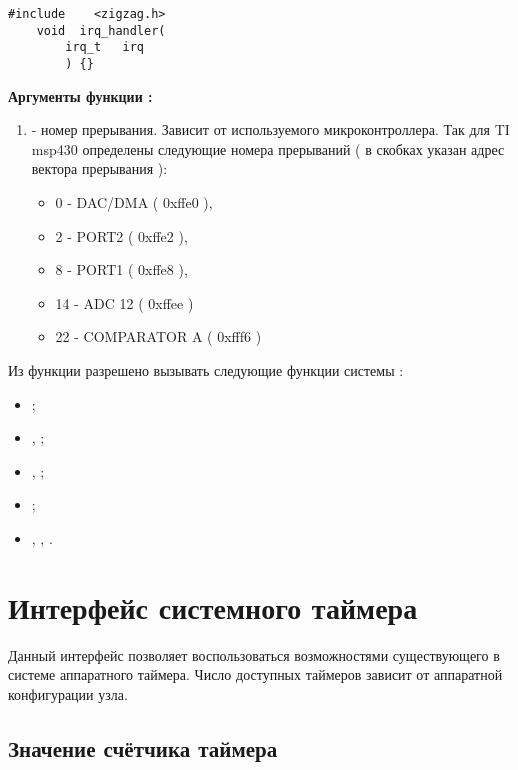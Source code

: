 \begin{lstlisting}[caption=Функция \myfunc{irq\_handler()} - обработчик прерываний., label=irqhandlerfunc ]
    #include    <zigzag.h>
    void  irq_handler(
        irq_t   irq
        ) {}
\end{lstlisting}

{\bfseries Аргументы функции :}

{\itshape
\begin{enumerate}
\item {} - номер прерывания. Зависит от используемого микроконтроллера. Так для TI msp430 определены
следующие номера прерываний ( в скобках указан адрес вектора прерывания ):
    \begin{itemize}
        \item 0 - DAC/DMA ( 0xffe0 ),
        \item 2 - PORT2 ( 0xffe2 ),
        \item 8 - PORT1 ( 0xffe8 ),
        \item 14 - ADC 12 ( 0xffee )
        \item 22 - COMPARATOR A ( 0xfff6 )
    \end{itemize}
\end{enumerate}
}

Из функции  разрешено вызывать следующие функции системы \zigzag:
\begin{itemize}
\item {};
\item {}, ;
\item {},  ;
\item {};
\item {}, , .
\end{itemize}

\section{Интерфейс системного таймера}

Данный интерфейс позволяет воспользоваться возможностями существующего в системе аппаратного таймера. Число
доступных таймеров зависит от аппаратной конфигурации узла.

\subsection{Значение счётчика таймера}

